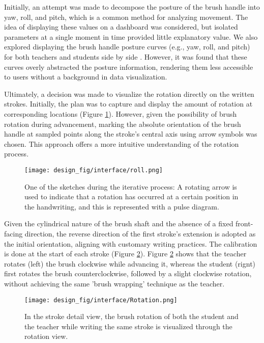 Initially, an attempt was made to decompose the posture of the brush handle into yaw, roll, and pitch\cite{fitzpatrick2010validation}, which is a common method for analyzing movement. The idea of displaying these values on a dashboard was considered, but isolated parameters at a single moment in time provided little explanatory value. We also explored displaying the brush handle posture curves (e.g., yaw, roll, and pitch) for both teachers and students side by side \cite{10.1145/3476124.3488645, 10.1145/1878083.1878098}. However, it was found that these curves overly abstracted the posture information, rendering them less accessible to users without a background in data visualization.

Ultimately, a decision was made to visualize the rotation directly on the written strokes. Initially, the plan was to capture and display the amount of rotation at corresponding locations (Figure \ref{fig:roll}). However, given the possibility of brush rotation during advancement, marking the absolute orientation of the brush handle at sampled points along the stroke's central axis using arrow symbols was chosen. This approach offers a more intuitive understanding of the rotation process.

\begin{figure}[htbp]
    \centering
    \texttt{[image: design\_fig/interface/roll.png]}
    \caption{One of the sketches during the iterative process: A rotating arrow is used to indicate that a rotation has occurred at a certain position in the handwriting, and this is represented with a pulse diagram.}
    \label{fig:roll}
\end{figure}

Given the cylindrical nature of the brush shaft and the absence of a fixed front-facing direction, the reverse direction of the first stroke's extension is adopted as the initial orientation, aligning with customary writing practices. The calibration is done at the start of each stroke (Figure \ref{fig:Rotation}). Figure \ref{fig:Rotation} shows that the teacher rotates (left) the brush clockwise while advancing it, whereas the student (rignt) first rotates the brush counterclockwise, followed by a slight clockwise rotation, without achieving the same 'brush wrapping' technique as the teacher.

\begin{figure}[htbp]
    \centering
    \texttt{[image: design\_fig/interface/Rotation.png]}
    \caption{In the stroke detail view, the brush rotation of both the student and the teacher while writing the same stroke is visualized through the rotation view.}
    \label{fig:Rotation}
\end{figure}

